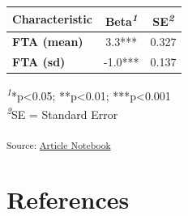 \documentclass[
]{agujournal2019}
\begin{document}
\setlength{\LTpost}{0mm}
\begin{longtable*}{lcc}
\toprule
\textbf{Characteristic} & \textbf{Beta}\textsuperscript{\textit{1}} & \textbf{SE}\textsuperscript{\textit{2}} \\ 
\midrule\addlinespace[2.5pt]
\textbf{FTA (mean)} & 3.3*** & 0.327 \\ 
\textbf{FTA (sd)} & -1.0*** & 0.137 \\ 
\bottomrule
\end{longtable*}
\begin{minipage}{\linewidth}
\textsuperscript{\textit{1}}*p\textless{}0.05; **p\textless{}0.01; ***p\textless{}0.001\\
\textsuperscript{\textit{2}}SE = Standard Error\\
\end{minipage}

\textsubscript{Source:
\href{https://fgabriel1891.github.io/quarto_template_rstudio/index.qmd.html}{Article
Notebook}}

\section{References}\label{references}
\end{document}
